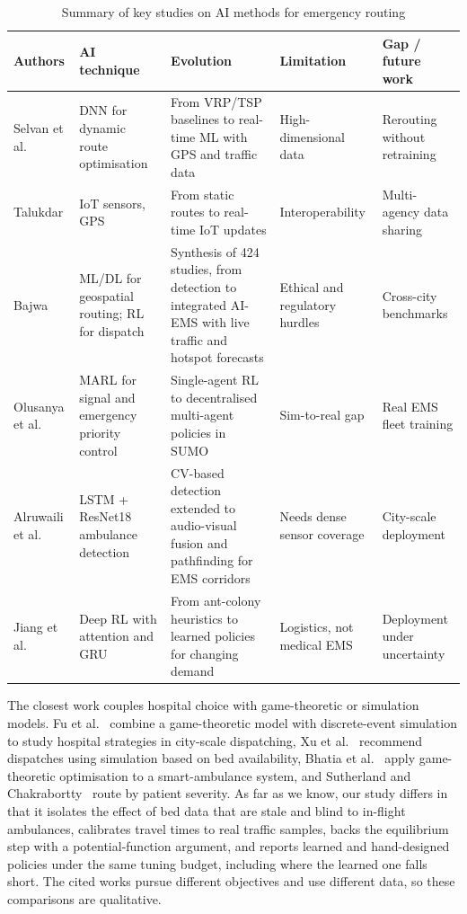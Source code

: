 \documentclass[conference]{IEEEtran}
\begin{document}
\begin{table}[t]
\caption{Summary of key studies on AI methods for emergency routing}\label{tab1}
\scriptsize
\centering
\begin{tabular}{p{2.3cm}p{3cm}p{5.2cm}p{2.8cm}p{3cm}}
\toprule
\textbf{Authors} & \textbf{AI technique} & \textbf{Evolution} & \textbf{Limitation} & \textbf{Gap / future work} \\
\midrule
Selvan et al.\ \cite{selvan2025ambulance} & DNN for dynamic route optimisation & From VRP/TSP baselines to real-time ML with GPS and traffic data & High-dimensional data & Rerouting without retraining \\
Talukdar \cite{talukdar2024real} & IoT sensors, GPS & From static routes to real-time IoT updates & Interoperability & Multi-agency data sharing \\
Bajwa \cite{bajwa2025ai} & ML/DL for geospatial routing; RL for dispatch & Synthesis of 424 studies, from detection to integrated AI-EMS with live traffic and hotspot forecasts & Ethical and regulatory hurdles & Cross-city benchmarks \\
Olusanya et al.\ \cite{olusanya2025multi} & MARL for signal and emergency priority control & Single-agent RL to decentralised multi-agent policies in SUMO & Sim-to-real gap & Real EMS fleet training \\
Alruwaili et al.\ \cite{alruwaili2025lstm} & LSTM + ResNet18 ambulance detection & CV-based detection extended to audio-visual fusion and pathfinding for EMS corridors & Needs dense sensor coverage & City-scale deployment \\
Jiang et al.\ \cite{jiang2022deep} & Deep RL with attention and GRU & From ant-colony heuristics to learned policies for changing demand & Logistics, not medical EMS & Deployment under uncertainty \\
\bottomrule
\end{tabular}
\end{table}

The closest work couples hospital choice with game-theoretic or simulation models. Fu et al.~\cite{fu2025modelling} combine a game-theoretic model with discrete-event simulation to study hospital strategies in city-scale dispatching, Xu et al.~\cite{xu2024emergency} recommend dispatches using simulation based on bed availability, Bhatia et al.~\cite{bhatia2024enhancing} apply game-theoretic optimisation to a smart-ambulance system, and Sutherland and Chakrabortty~\cite{sutherland2023optimal} route by patient severity. As far as we know, our study differs in that it isolates the effect of bed data that are stale and blind to in-flight ambulances, calibrates travel times to real traffic samples, backs the equilibrium step with a potential-function argument, and reports learned and hand-designed policies under the same tuning budget, including where the learned one falls short. The cited works pursue different objectives and use different data, so these comparisons are qualitative.
\end{document}
